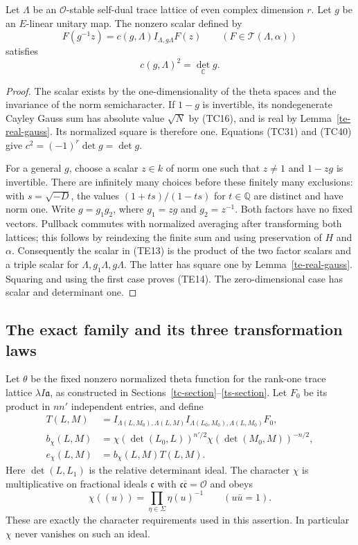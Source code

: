 \begin{proposition}\label{te-unitary-square}
Let $\Lambda$ be an $\mathcal O$-stable self-dual trace
lattice of even complex dimension $r$.  Let $g$ be
an $E$-linear unitary map.  The nonzero scalar defined by
\[
          F(g^{-1}z)=c(g,\Lambda)I_{\Lambda,g\Lambda}F(z)
                        \qquad(F\in\mathcal T(\Lambda,\alpha))
 \tag{TE13}
\]
satisfies
\[
                         c(g,\Lambda)^2=\det_{\mathbb C}g.
 \tag{TE14}
\]
\end{proposition}
\begin{proof}
The scalar exists by the one-dimensionality of the theta
spaces and the invariance of the norm semicharacter.
If $1-g$ is invertible, its nondegenerate Cayley Gauss
sum has absolute value $\sqrt N$ by (TC16), and is real
by Lemma~\ref{te-real-gauss}.  Its normalized square is
therefore one.  Equations (TC31) and (TC40) give
$c^2=(-1)^r\det g=\det g$.

For a general $g$, choose a scalar $z\in k$ of norm one
such that $z\ne1$ and $1-zg$ is invertible.
There are infinitely many choices before these finitely
many exclusions: with $s=\sqrt{-D}$, the values
$(1+ts)/(1-ts)$ for $t\in\mathbb Q$ are distinct and
have norm one.
Write $g=g_1g_2$, where $g_1=zg$ and $g_2=z^{-1}$.
Both factors have no fixed vectors.
Pullback commutes with normalized averaging after
transforming both lattices; this follows by reindexing
the finite sum and using preservation of $H$ and $\alpha$.
Consequently the scalar in (TE13) is the product of the
two factor scalars and a triple scalar for
$\Lambda,g_1\Lambda,g\Lambda$.
The latter has square one by Lemma~\ref{te-real-gauss}.
Squaring and using the first case proves (TE14).
The zero-dimensional case has scalar and determinant one.
\end{proof}

\subsection{The exact family and its three transformation laws}

Let $\theta$ be the fixed nonzero normalized theta
function for the rank-one trace lattice
$\lambda I\mathfrak a$, as constructed in
Sections~\ref{tc-section}--\ref{ts-section}.
Let $F_0$ be its product in $nn'$ independent entries,
and define
\[
 \begin{split}
 T(L,M)&=I_{\Lambda(L,M_0),\Lambda(L,M)}
                 I_{\Lambda(L_0,M_0),\Lambda(L,M_0)}F_0,\\
 b_\chi(L,M)&=\chi(\det(L_0,L))^{n'/2}
                             \chi(\det(M_0,M))^{-n/2},\\
 e_\chi(L,M)&=b_\chi(L,M)T(L,M).
 \end{split}
 \tag{TE15}
\]
Here $\det(L,L_1)$ is the relative determinant ideal.
The character $\chi$ is multiplicative on fractional
ideals $\mathfrak c$ with
$\mathfrak c\overline{\mathfrak c}=\mathcal O$ and obeys
\[
             \chi((u))=\prod_{\eta\in\Sigma}\eta(u)^{-1}
                          \qquad(u\bar u=1).
 \tag{TE16}
\]
These are exactly the character requirements used in
this assertion.  In particular $\chi$ never vanishes
on such an ideal.

